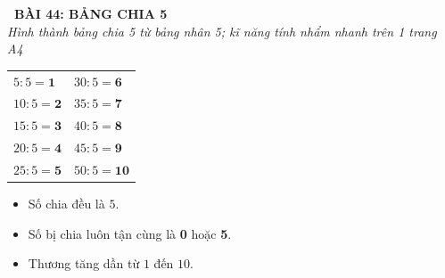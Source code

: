 \documentclass[11pt,a4paper]{article}
\begin{document}
\begin{tcolorbox}[
  enhanced,
  colback=violet!8!white,
  colframe=violet!70!black,
  arc=3mm, boxrule=1.2pt,
  left=3mm, right=3mm, top=2mm, bottom=2mm,
  halign=center
]
  {\LARGE\bfseries\color{violet!90!black}\faBookmark\ BÀI 44: BẢNG CHIA 5}\\[1mm]
  {\itshape\footnotesize\color{black!75} Hình thành bảng chia 5 từ bảng nhân 5; kĩ năng tính nhẩm nhanh trên 1 trang A4}
\end{tcolorbox}

\vspace{-2mm}

\noindent
\begin{minipage}[t]{0.49\textwidth}\vspace{0pt}
\begin{tcolorbox}[
  enhanced,
  colback=violet!4!white,
  colframe=violet!75!black,
  arc=2mm, boxrule=0.8pt,
  left=2mm, right=2mm, top=1.8mm, bottom=1.8mm,
  title={\footnotesize\bfseries\color{white}\faKey\ 1. Bảng chia 5 chuẩn mực}
]
{\footnotesize
\begin{tabular}{l@{\quad}l}
  $5 : 5 = \mathbf{1}$ & $30 : 5 = \mathbf{6}$ \\
  $10 : 5 = \mathbf{2}$ & $35 : 5 = \mathbf{7}$ \\
  $15 : 5 = \mathbf{3}$ & $40 : 5 = \mathbf{8}$ \\
  $20 : 5 = \mathbf{4}$ & $45 : 5 = \mathbf{9}$ \\
  $25 : 5 = \mathbf{5}$ & $50 : 5 = \mathbf{10}$
\end{tabular}
\vspace{1mm}
\begin{itemize}\setlength{\itemsep}{0.5pt}\setlength{\leftskip}{-2.5mm}
  \item Số chia đều là $5$.
  \item Số bị chia luôn tận cùng là \textbf{0} hoặc \textbf{5}.
  \item Thương tăng dần từ $1$ đến $10$.
\end{itemize}
}
\end{tcolorbox}
\end{minipage}
\hfill
\end{document}
